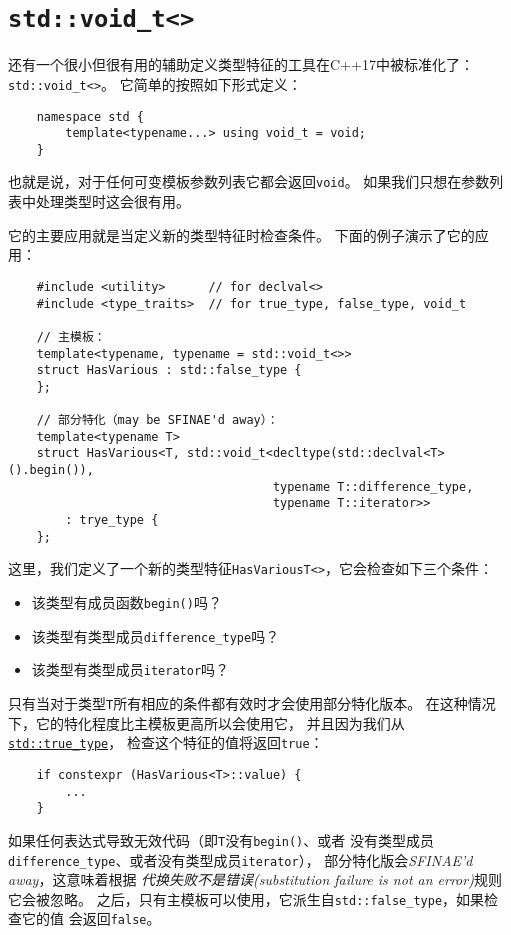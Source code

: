 \section{\texttt{std::void\_t<>}}\label{ch33.3}
还有一个很小但很有用的辅助定义类型特征的工具在C++17中被标准化了：\texttt{std::void\_t<>}。
它简单的按照如下形式定义：
\begin{lstlisting}
    namespace std {
        template<typename...> using void_t = void;
    }
\end{lstlisting}
也就是说，对于任何可变模板参数列表它都会返回\texttt{void}。
如果我们只想在参数列表中处理类型时这会很有用。

它的主要应用就是当定义新的类型特征时检查条件。
下面的例子演示了它的应用：
\begin{lstlisting}
    #include <utility>      // for declval<>
    #include <type_traits>  // for true_type, false_type, void_t

    // 主模板：
    template<typename, typename = std::void_t<>>
    struct HasVarious : std::false_type {
    };

    // 部分特化（may be SFINAE'd away）：
    template<typename T>
    struct HasVarious<T, std::void_t<decltype(std::declval<T>().begin()),
                                     typename T::difference_type,
                                     typename T::iterator>>
        : trye_type {
    };
\end{lstlisting}
这里，我们定义了一个新的类型特征\texttt{HasVariousT<>}，它会检查如下三个条件：
\begin{itemize}
    \item 该类型有成员函数\texttt{begin()}吗？
    \item 该类型有类型成员\texttt{difference\_type}吗？
    \item 该类型有类型成员\texttt{iterator}吗？
\end{itemize}
只有当对于类型\texttt{T}所有相应的条件都有效时才会使用部分特化版本。
在这种情况下，它的特化程度比主模板更高所以会使用它，
并且因为我们从\hyperref[ch33.2]{\texttt{std::true\_type}}，
检查这个特征的值将返回\texttt{true}：
\begin{lstlisting}
    if constexpr (HasVarious<T>::value) {
        ...
    }
\end{lstlisting}
如果任何表达式导致无效代码（即\texttt{T}没有\texttt{begin()}、或者
没有类型成员\texttt{difference\_type}、或者没有类型成员\texttt{iterator}），
部分特化版会\emph{SFINAE'd away}，这意味着根据
\emph{代换失败不是错误(substitution failure is not an error)}规则它会被忽略。
之后，只有主模板可以使用，它派生自\texttt{std::false\_type}，如果检查它的值
会返回\texttt{false}。

